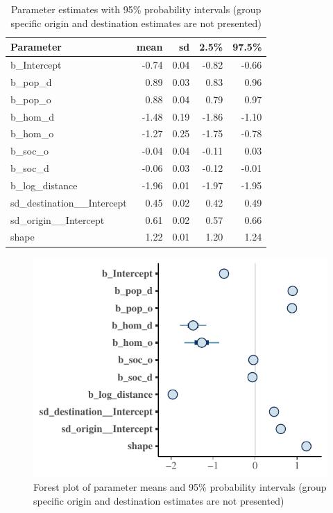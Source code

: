 \documentclass[12pt, parskip, abstracton,notitlepage]{scrartcl}
\begin{document}
{{		%
		\begin{table}[ht]
			\centering
			\caption{Parameter estimates with 95\% probability intervals (group specific origin and destination estimates are not presented)}
			\label{tab:coef}
			\begin{tabular}{lrrrr}
				\toprule
				Parameter & mean & sd & 2.5\% & 97.5\% \\ 
				\midrule
				b\_Intercept & -0.74 & 0.04 & -0.82 & -0.66 \\ 
				b\_pop\_d & 0.89 & 0.03 & 0.83 & 0.96 \\ 
				b\_pop\_o & 0.88 & 0.04 & 0.79 & 0.97 \\ 
				b\_hom\_d & -1.48 & 0.19 & -1.86 & -1.10 \\ 
				b\_hom\_o & -1.27 & 0.25 & -1.75 & -0.78 \\ 
				b\_soc\_o & -0.04 & 0.04 & -0.11 & 0.03 \\ 
				b\_soc\_d & -0.06 & 0.03 & -0.12 & -0.01 \\ 
				b\_log\_distance & -1.96 & 0.01 & -1.97 & -1.95 \\ 
				sd\_destination\_\_Intercept & 0.45 & 0.02 & 0.42 & 0.49 \\ 
				sd\_origin\_\_Intercept & 0.61 & 0.02 & 0.57 & 0.66 \\ 
				shape & 1.22 & 0.01 & 1.20 & 1.24 \\ 
				\bottomrule
			\end{tabular}
		\end{table}
		
		\begin{figure}
			\includegraphics[width = \columnwidth]{../fig/forestplot.pdf}
			\caption{Forest plot of parameter means and 95\% probability
				intervals (group specific origin and destination estimates are not
				presented)}
			\label{fig:forestplot}
		\end{figure}
		
}}
\end{document}
